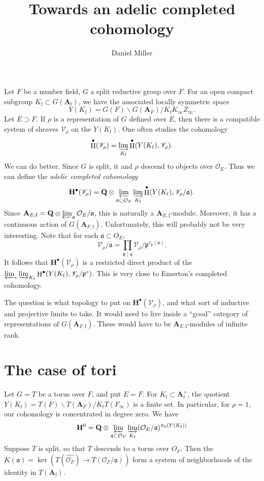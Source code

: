 \documentclass{article}
\title{Towards an adelic completed cohomology}
\author{Daniel Miller}
\DeclareMathOperator{\h}{H}
\newcommand{\cO}{\mathcal{O}}
\newcommand{\dA}{\mathbf{A}}
\newcommand{\dQ}{\mathbf{Q}}
\newcommand{\fa}{\mathfrak{a}}
\newcommand{\fp}{\mathfrak{p}}
\newcommand{\sV}{\mathscr{V}}
\newcommand{\finite}{\mathrm{f}}
\begin{document}
\maketitle




Let $F$ be a number field, $G$ a split reductive group over $F$. For an 
open compact subgroup $K_\finite\subset G(\dA_\finite)$, we have the associated 
locally symmetric space 
\[
  Y(K_\finite) = G(F) \backslash G(\dA_F) / K_\finite K_\infty Z_\infty .
\]
Let $E\supset F$. If $\rho$ is a representation of $G$ defined over $E$, then 
there is a compatible system of sheaves $\sV_\rho$ on the $Y(K_\finite)$. One 
often studies the cohomology 
\[
  \h^\bullet(\sV_\rho) = \varinjlim_{K_\finite} \h^\bullet(Y(K_\finite),\sV_\rho) .
\]
We can do better. Since $G$ is split, it and $\rho$ descend to objects over 
$\cO_E$. Thus we can define the \emph{adelic completed cohomology} 
\[
  \mathbf{H}^\bullet(\sV_\rho) = \dQ\otimes \varprojlim_{\fa\subset \cO_E} \varinjlim_{K_\finite} \h^\bullet(Y(K_\finite),\sV_\rho / \fa) .
\]
Since $\dA_{E,\finite}=\dQ\otimes\varprojlim_\fa \cO_E/\fa$, this is naturally a 
$\dA_{E,\finite}$-module. Moreover, it has a continuous action of 
$G(\dA_{F,\finite})$. Unfortunately, this will probably not be very 
interesting. Note that for each $\fa\subset O_E$, 
\[
  \sV_\rho/\fa = \prod_{\fp\mid\fa} \sV_\rho / \fp^{v_\fp(\fa)} .
\]
It follows that $\mathbf{H}^\bullet(\sV_\rho)$ is a restricted direct product 
of the 
$\varprojlim_e \varinjlim_{K_\finite} \h^\bullet(Y(K_\finite),\sV_\rho/\fp^e)$. 
This is very close to Emerton's completed cohomology. 

The question is what topology to put on $\mathbf{H}^\bullet(\sV_\rho)$, and 
what sort of inductive and projective limits to take. It would need to live 
inside a ``good'' category of representations of $G(\dA_{F,\finite})$. These 
would have to be $\dA_{E,\finite}$-modules of infinite rank. 





\section{The case of tori}

Let $G=T$ be a torus over $F$, and put $E=F$. For 
$K_\finite\subset \dA_\finite^\times$, the quotient 
$Y(K_\finite)=T(F)\backslash T(\dA_F) / K_\finite T(F_\infty)$ is a 
finite set. In particular, for $\rho=1$, our cohomology is concentrated in 
degree zero. We have 
\[
  \mathbf{H}^0 = \dQ\otimes \varprojlim_{\fa\subset \cO_F} \varinjlim_{K_\finite} (\cO_E/\fa)^{\pi_0(Y(K_\finite))}
\]
Suppose $T$ is split, so that $T$ descends to a torus over $O_F$. Then the 
$K(\fa) = \ker(T(\widehat{\cO_F}) \to T(\cO_F/\fa))$ form a system of neighborhoods 
of the identity in $T(\dA_\finite)$. 
\end{document}
